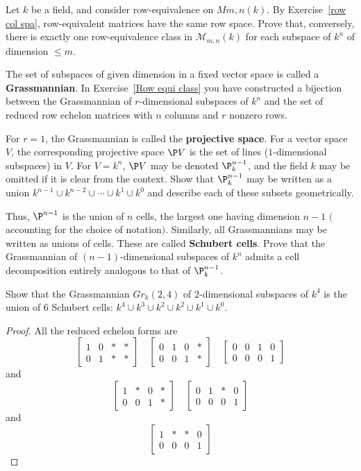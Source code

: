 \begin{exercise}\label{Row equi class}
Let $k$ be a field, and consider row-equivalence on $Mm,n(k)$. By Exercise~\ref{row col spa}, row-equivalent matrices have the same row space. Prove that, conversely, there is exactly one row-equivalence class in $\mathcal{M}_{m,n}(k)$ for each subspace of $k^n$ of dimension $\leqslant m$.
\end{exercise}
\begin{exercise}
The set of subspaces of given dimension in a fixed vector space is called a \textbf{Grassmannian}. In Exercise~\ref{Row equi class} you have constructed a bijection between the Grassmannian of $r$-dimensional subspaces of $k^n$ and the set of reduced row echelon matrices with $n$ columns and $r$ nonzero rows.\par
For $r=1$, the Grassmannian is called the \textbf{projective space}. For a vector space $V$, the corresponding projective space $\P V$ is the set of lines ($1$-dimensional subspaces) in $V$. For $V=k^n$, $\P V$ may be denoted $\P^{n-1}_k$, and the field $k$ may be omitted if it is clear from the context. Show that $\P^{n-1}_k$ may be written as a union $k^{n-1}\cup k^{n-2}\cup\cdots\cup k^1\cup k^0$ and describe each of these subsets geometrically.\par
Thus, $\P^{n-1}$ is the union of $n$ cells, the largest one having dimension $n-1$ $($accounting for the choice of notation$)$. Similarly, all Grassmannians may be written as unions of cells. These are called \textbf{Schubert cells}.
Prove that the Grassmannian of $(n-1)$-dimensional subspaces of $k^n$ admits a cell decomposition entirely analogous to that of $\P^{n-1}_k$.
\end{exercise}
\begin{exercise}
Show that the Grassmannian $Gr_k(2,4)$ of $2$-dimensional subspaces of $k^4$ is the union of $6$ Schubert cells: $k^4\cup k^3\cup k^2\cup k^2\cup k^1\cup k^0$.
\end{exercise}
\begin{proof}
All the reduced echelon forms are
\[\begin{bmatrix}
1&0&*&*\\
0&1&*&*
\end{bmatrix}\quad\begin{bmatrix}
0&1&0&*\\
0&0&1&*
\end{bmatrix}\quad\begin{bmatrix}
0&0&1&0\\
0&0&0&1
\end{bmatrix}\]
and
\[\begin{bmatrix}
1&*&0&*\\
0&0&1&*
\end{bmatrix}\quad
\begin{bmatrix}
0&1&*&0\\
0&0&0&1
\end{bmatrix}\]
and
\[\begin{bmatrix}
1&*&*&0\\
0&0&0&1
\end{bmatrix}\]
\end{proof}
